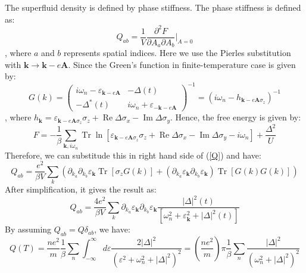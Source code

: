 \documentclass{article}
\newcommand{\nobracket}{}
\newcommand{\tmmathbf}[1]{\ensuremath{\boldsymbol{#1}}}
\newcommand{\tmop}[1]{\ensuremath{\operatorname{#1}}}
\begin{document}
The superfluid density is defined by phase stiffness. The phase stiffness is
defined as:
\begin{equation}
  Q_{a b} = \frac{1}{V} \frac{\partial^2 F}{\partial A_a \partial A_b} |_{A =
  0} \nobracket \label{Q}
\end{equation}
, where $a$ and $b$ represents spatial indices. Here we use the Pierles
substitution with $\tmmathbf{k} \rightarrow \tmmathbf{k}- e\tmmathbf{A}$.
Since the Green's function in finite-temperature case is given by:
\begin{equation}
  G (k) = \left(\begin{array}{cc}
    i \omega_n - \varepsilon_{\tmmathbf{k}- e\tmmathbf{A}} & - \Delta (t)\\
    - \Delta^{\ast} (t) & i \omega_n + \varepsilon_{-\tmmathbf{k}-
    e\tmmathbf{A}}
  \end{array}\right)^{- 1} = (i \omega_n - h_{\tmmathbf{k}- e\tmmathbf{A}
  \sigma_z})^{- 1}
\end{equation}
, where $h_{\tmmathbf{k}} = \varepsilon_{\tmmathbf{k}- e\tmmathbf{A} \sigma_z}
\sigma_z + \tmop{Re} \Delta \sigma_x - \tmop{Im} \Delta \sigma_y$. Hence, the
free energy is given by:
\begin{equation}
  F = - \frac{1}{\beta} \sum_{\tmmathbf{k}, i \omega_n} \tmop{Tr} \ln
  [\varepsilon_{\tmmathbf{k}- e\tmmathbf{A} \sigma_z} \sigma_z + \tmop{Re}
  \Delta \sigma_x - \tmop{Im} \Delta \sigma_y - i \omega_n] +
  \frac{\Delta^2}{U}
\end{equation}
Therefore, we can substitude this in right hand side of (\ref{Q}) and have:
\begin{equation}
  Q_{a b} = \frac{e^2}{\beta V} \sum_k (\partial_{k_a} \partial_{k_b}
  \varepsilon_{\tmmathbf{k}} \tmop{Tr} [\sigma_z G (k)] + (\partial_{k_a}
  \varepsilon_{\tmmathbf{k}} \partial_{k_b} \varepsilon_{\tmmathbf{k}})
  \tmop{Tr} [G (k) G (k)])
\end{equation}
After simplification, it gives the result as:
\begin{equation}
  Q_{a b} = \frac{4 e^2}{\beta V} \sum_k \partial_{k_a}
  \varepsilon_{\tmmathbf{k}} \partial_{k_b} \varepsilon_{\tmmathbf{k}} \frac{|
  \Delta |^2 (t)}{[\omega_n^2 + \varepsilon_{\tmmathbf{k}}^2 + | \Delta |^2
  (t)]}
\end{equation}
By assuming $Q_{a b} = Q \delta_{a b}$, we have:
\begin{equation}
  Q (T) = \frac{n e^2}{m} \frac{1}{\beta} \sum_n \int_{- \infty}^{\infty} d
  \varepsilon \frac{2 | \Delta |^2}{(\varepsilon^2 + \omega_n^2 + | \Delta
  |^2)^2} = \left( \frac{n e^2}{m} \right) \pi \frac{1}{\beta} \sum_n \frac{|
  \Delta |^2}{(\omega_n^2 + | \Delta |^2)^2}
\end{equation}
\end{document}
